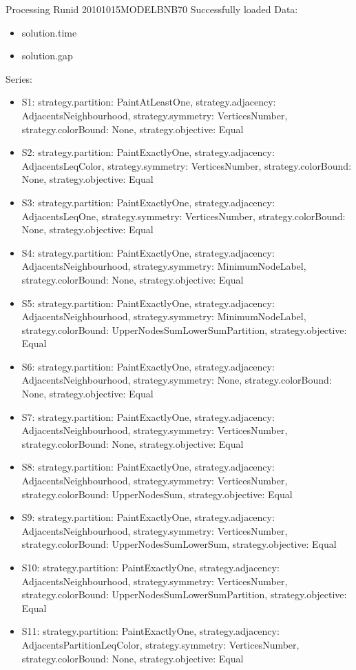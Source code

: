 \documentclass[landscape, 12pt]{report}
\begin{document}
Processing Runid 20101015MODELBNB70
 Successfully loaded
Data:
\begin{itemize}
\item solution.time
\item solution.gap
\end{itemize}
Series:
\begin{itemize}
\item S1: strategy.partition: PaintAtLeastOne, strategy.adjacency: AdjacentsNeighbourhood, strategy.symmetry: VerticesNumber, strategy.colorBound: None, strategy.objective: Equal
\item S2: strategy.partition: PaintExactlyOne, strategy.adjacency: AdjacentsLeqColor, strategy.symmetry: VerticesNumber, strategy.colorBound: None, strategy.objective: Equal
\item S3: strategy.partition: PaintExactlyOne, strategy.adjacency: AdjacentsLeqOne, strategy.symmetry: VerticesNumber, strategy.colorBound: None, strategy.objective: Equal
\item S4: strategy.partition: PaintExactlyOne, strategy.adjacency: AdjacentsNeighbourhood, strategy.symmetry: MinimumNodeLabel, strategy.colorBound: None, strategy.objective: Equal
\item S5: strategy.partition: PaintExactlyOne, strategy.adjacency: AdjacentsNeighbourhood, strategy.symmetry: MinimumNodeLabel, strategy.colorBound: UpperNodesSumLowerSumPartition, strategy.objective: Equal
\item S6: strategy.partition: PaintExactlyOne, strategy.adjacency: AdjacentsNeighbourhood, strategy.symmetry: None, strategy.colorBound: None, strategy.objective: Equal
\item S7: strategy.partition: PaintExactlyOne, strategy.adjacency: AdjacentsNeighbourhood, strategy.symmetry: VerticesNumber, strategy.colorBound: None, strategy.objective: Equal
\item S8: strategy.partition: PaintExactlyOne, strategy.adjacency: AdjacentsNeighbourhood, strategy.symmetry: VerticesNumber, strategy.colorBound: UpperNodesSum, strategy.objective: Equal
\item S9: strategy.partition: PaintExactlyOne, strategy.adjacency: AdjacentsNeighbourhood, strategy.symmetry: VerticesNumber, strategy.colorBound: UpperNodesSumLowerSum, strategy.objective: Equal
\item S10: strategy.partition: PaintExactlyOne, strategy.adjacency: AdjacentsNeighbourhood, strategy.symmetry: VerticesNumber, strategy.colorBound: UpperNodesSumLowerSumPartition, strategy.objective: Equal
\item S11: strategy.partition: PaintExactlyOne, strategy.adjacency: AdjacentsPartitionLeqColor, strategy.symmetry: VerticesNumber, strategy.colorBound: None, strategy.objective: Equal
\end{itemize}
\end{document}

